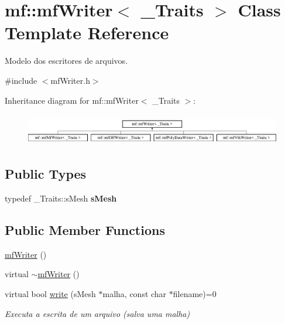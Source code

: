 \hypertarget{classmf_1_1mfWriter}{
\section{mf::mfWriter$<$ \_\-Traits $>$ Class Template Reference}
\label{classmf_1_1mfWriter}
}


Modelo dos escritores de arquivos.  




{\ttfamily \#include $<$mfWriter.h$>$}

Inheritance diagram for mf::mfWriter$<$ \_\-Traits $>$:\begin{figure}[H]
\begin{center}
\leavevmode
\includegraphics[height=1.407035cm]{classmf_1_1mfWriter}
\end{center}
\end{figure}
\subsection*{Public Types}
\begin{DoxyCompactItemize}
\item 
\hypertarget{classmf_1_1mfWriter_ab2e5e3009b068b86819bdb50a284809b}{
typedef \_\-Traits::sMesh {\bfseries sMesh}}
\label{classmf_1_1mfWriter_ab2e5e3009b068b86819bdb50a284809b}

\end{DoxyCompactItemize}
\subsection*{Public Member Functions}
\begin{DoxyCompactItemize}
\item 
\hyperlink{classmf_1_1mfWriter_a5c3d89035c391fcdb02e72efd5f6fb36}{mfWriter} ()
\item 
virtual \hyperlink{classmf_1_1mfWriter_acee9f2b54a145e68d165ab9fdb110865}{$\sim$mfWriter} ()
\item 
virtual bool \hyperlink{classmf_1_1mfWriter_a85d6c59bdb8fec69222e4157c299256c}{write} (sMesh $\ast$malha, const char $\ast$filename)=0
\begin{DoxyCompactList}\small\item\em Executa a escrita de um arquivo (salva uma malha) \item\end{DoxyCompactList}\end{DoxyCompactItemize}


